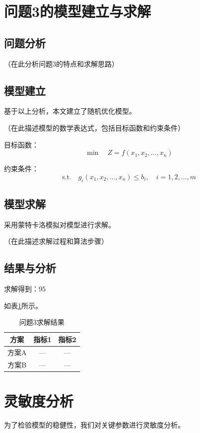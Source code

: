 \documentclass[12pt,a4paper]{article}
\begin{document}
\section{问题3的模型建立与求解}
\subsection{问题分析}
（在此分析问题3的特点和求解思路）

\subsection{模型建立}
基于以上分析，本文建立了随机优化模型。

（在此描述模型的数学表达式，包括目标函数和约束条件）

目标函数：
\begin{equation}
\min \quad Z = f(x_1, x_2, \ldots, x_n)
\end{equation}

约束条件：
\begin{equation}
\text{s.t.} \quad g_i(x_1, x_2, \ldots, x_n) \leq b_i, \quad i = 1, 2, \ldots, m
\end{equation}

\subsection{模型求解}
采用蒙特卡洛模拟对模型进行求解。

（在此描述求解过程和算法步骤）

\subsection{结果与分析}
求解得到：95%

如表\ref{tab:result3}所示。

\begin{table}[H]
  \centering
  \caption{问题3求解结果}
  \label{tab:result3}
  \begin{tabular}{ccc}
    \toprule
    方案 & 指标1 & 指标2 \\
    \midrule
    方案A & — & — \\
    方案B & — & — \\
    \bottomrule
  \end{tabular}
\end{table}

\section{灵敏度分析}
为了检验模型的稳健性，我们对关键参数进行灵敏度分析。
\end{document}
